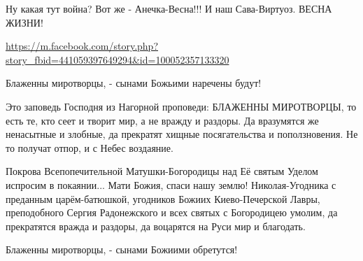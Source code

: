 \begin{multicols}{2}
Ну какая тут война?
Вот же - Анечка-Весна!!!
И наш Сава-Виртуоз.
ВЕСНА ЖИЗНИ!

\url{https://m.facebook.com/story.php?story_fbid=441059397649294&id=100052357133320}

Блаженны миротворцы, - сынами Божьими наречены будут!

Это заповедь Господня из Нагорной проповеди: БЛАЖЕННЫ МИРОТВОРЦЫ, то есть те,
кто сеет и творит мир, а не вражду и раздоры. Да вразумятся же ненасытные и
злобные, да прекратят хищные посягательства и поползновения. Не то получат
отпор, и с Небес воздаяние.

Покрова Всепопечительной Матушки-Богородицы над Её святым Уделом испросим в
покаянии... Мати Божия, спаси нашу землю! Николая-Угодника с преданным
царём-батюшкой, угодников Божиих Киево-Печерской Лавры, преподобного Сергия
Радонежского и всех святых с Богородицею умолим, да прекратятся вражда и
раздоры, да воцарятся на Руси мир и благодать.

Блаженны миротворцы, - сынами Божиими обретутся!


\end{multicols} %
